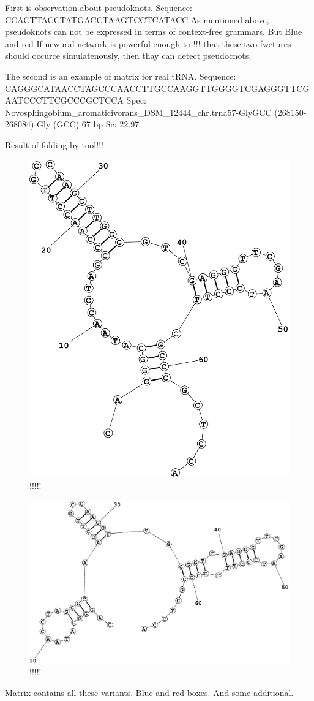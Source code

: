 \documentclass[a4paper,twoside]{article}
\begin{document}
First is observation about pseudoknots. 
Sequence: CCACTTACCTATGACCTAAGTCCTCATACC
As mentioned above, pseudoknots can not be expressed in terms of context-free grammars. 
But 
Blue and red
If newural network is powerful enough to !!! that these two fwetures should occurce simulatenously, then thay can detect pseudocnots.

The second is an example of matrix for real tRNA.
Sequence: CAGGGCATAACCTAGCCCAACCTTGCCAAGGTTGGGGTCGAGGGTTCGAATCCCTTCGCCCGCTCCA
Spec: Novosphingobium\_aromaticivorans\_DSM\_12444\_chr.trna57-GlyGCC (268150-268084)  Gly (GCC) 67 bp Sc: 22.97

Result of folding by tool!!!

\begin{figure}
\centering
\includegraphics[width=.5\textwidth]{figures/Fold1.pdf}
\caption{!!!!!}
\label{fig:!!!}
\end{figure}


\begin{figure}
\centering
\includegraphics[width=.5\textwidth]{figures/Fold2.pdf}
\caption{!!!!!}
\label{fig:!!!}
\end{figure}


Matrix contains all these variants.
Blue and red boxes.
And some additional.
\end{document}
